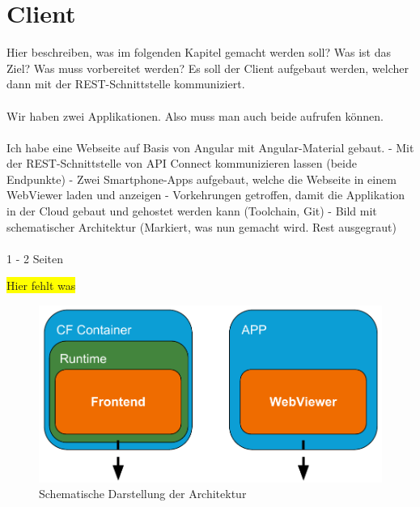 \chapter{Client}
\label{ch:client}
Hier beschreiben, was im folgenden Kapitel gemacht werden soll? Was ist das Ziel? Was muss vorbereitet werden?
Es soll der Client aufgebaut werden, welcher dann mit der REST-Schnittstelle kommuniziert.
\\ \\
Wir haben zwei Applikationen. Also muss man auch beide aufrufen können.
\\ \\
Ich habe eine Webseite auf Basis von Angular mit Angular-Material gebaut. - Mit der REST-Schnittstelle von API Connect
kommunizieren lassen (beide Endpunkte) - Zwei Smartphone-Apps aufgebaut,
welche die Webseite in einem WebViewer laden und anzeigen - Vorkehrungen getroffen, damit die Applikation in der Cloud
gebaut und gehostet werden kann (Toolchain, Git) - Bild mit schematischer Architektur (Markiert, was nun gemacht wird.
Rest ausgegraut)
\\ \\
1 - 2 Seiten

\colorbox{yellow}{Hier fehlt was}

\begin{figure}[h]
    \centering
    \includegraphics[scale=0.5]{images/kapitel_4/architektur_schematisch.pdf}
    \caption{Schematische Darstellung der Architektur}
    \label{fig:schematische_architektur_4}
\end{figure}